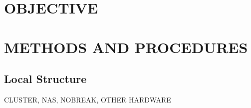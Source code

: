 \documentclass[twoside,a4paper,12pt,english]{inac17}
\begin{document}

\section{OBJECTIVE}


\section{METHODS AND PROCEDURES}

\subsection{Local Structure}
CLUSTER, NAS, NOBREAK, OTHER HARDWARE


\end{document}
